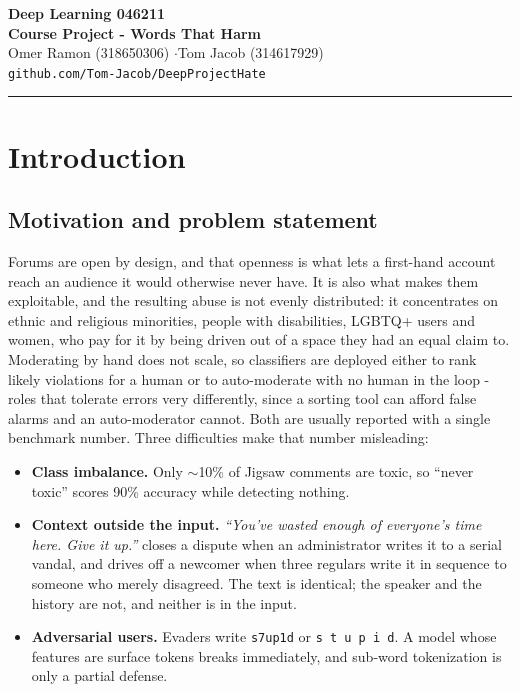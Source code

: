 \documentclass[10pt,a4paper]{article}
\begin{document}
\begin{center}
{\LARGE\bfseries Deep Learning 046211\\Course Project - Words That Harm}\\[0.35em]
{Omer Ramon (318650306) \quad$\cdot$\quad Tom Jacob (314617929)}\\[0.25em]
{\small\texttt{github.com/Tom-Jacob/DeepProjectHate}}
\end{center}
\vspace{0.6em}
\hrule
\section{Introduction}

\subsection{Motivation and problem statement}
\label{sec:motivation}

Forums are open by design, and that openness is what lets a first-hand account reach an
audience it would otherwise never have. It is also what makes them exploitable, and the
resulting abuse is not evenly distributed: it concentrates on ethnic and religious
minorities, people with disabilities, LGBTQ+ users and women, who pay for it by being
driven out of a space they had an equal claim to. Moderating by hand does not scale, so
classifiers are deployed either to rank likely violations for a human or to auto-moderate
with no human in the loop - roles that tolerate errors very differently, since a sorting
tool can afford false alarms and an auto-moderator cannot. Both are usually reported with
a single benchmark number. Three difficulties make that number misleading:
\begin{itemize}
    \item \textbf{Class imbalance.} Only $\sim$10\% of Jigsaw comments are toxic, so ``never
toxic'' scores 90\% accuracy while detecting nothing.
\item \textbf{Context outside the input.} \emph{``You've wasted enough of everyone's time
here. Give it up.''} closes a dispute when an administrator writes it to a serial vandal,
and drives off a newcomer when three regulars write it in sequence to someone who merely
disagreed. The text is identical; the speaker and the history are not, and neither is in
the input.
\item \textbf{Adversarial users.} Evaders write \texttt{s7up1d} or \texttt{s t u p i d}. A
model whose features are surface tokens breaks immediately, and sub-word tokenization is
only a partial defense.
\end{itemize}
\end{document}
